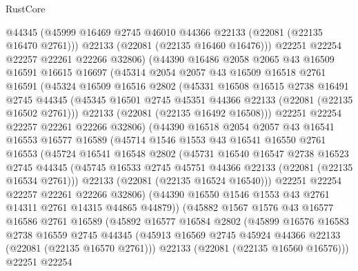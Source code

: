 \begin{lexlean}{RustCore}
\begin{coremodule}
          @44345
          (@45999 @16469 @2745 @46010 @44366 @22133 (@22081 (@22135 @16470 @2761)))
          @22133
          (@22081 (@22135 @16460 @16476)))
        @22251
        @22254
        @22257
        @22261
        @22266
        @32806)
      (@44390
        @16486
        @2058
        @2065
        @43
        @16509
        @16591
        @16615
        @16697
        (@45314
          @2054
          @2057
          @43
          @16509
          @16518
          @2761
          @16591
          (@45324
            @16509
            @16516
            @2802
            (@45331
              @16508
              @16515
              @2738
              @16491
              @2745
              @44345
              (@45345 @16501 @2745 @45351 @44366 @22133 (@22081 (@22135 @16502 @2761)))
              @22133
              (@22081 (@22135 @16492 @16508)))
            @22251
            @22254
            @22257
            @22261
            @22266
            @32806)
          (@44390
            @16518
            @2054
            @2057
            @43
            @16541
            @16553
            @16577
            @16589
            (@45714
              @1546
              @1553
              @43
              @16541
              @16550
              @2761
              @16553
              (@45724
                @16541
                @16548
                @2802
                (@45731
                  @16540
                  @16547
                  @2738
                  @16523
                  @2745
                  @44345
                  (@45745 @16533 @2745 @45751 @44366 @22133 (@22081 (@22135 @16534 @2761)))
                  @22133
                  (@22081 (@22135 @16524 @16540)))
                @22251
                @22254
                @22257
                @22261
                @22266
                @32806)
              (@44390 @16550 @1546 @1553 @43 @2761 @14311 @2761 @14315 @44865 @44879))
            (@45882
              @1567
              @1576
              @43
              @16577
              @16586
              @2761
              @16589
              (@45892
                @16577
                @16584
                @2802
                (@45899
                  @16576
                  @16583
                  @2738
                  @16559
                  @2745
                  @44345
                  (@45913 @16569 @2745 @45924 @44366 @22133 (@22081 (@22135 @16570 @2761)))
                  @22133
                  (@22081 (@22135 @16560 @16576)))
                @22251
                @22254

\end{coremodule}
\end{lexlean}

